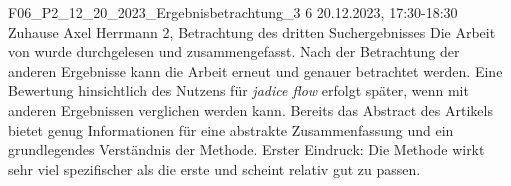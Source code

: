 \fieldnote
{F06\_P2\_12\_20\_2023\_Ergebnisbetrachtung\_3}
{6}
{20.12.2023, 17:30-18:30}
{Zuhause}
{Axel Herrmann}
{2, Betrachtung des dritten Suchergebnisses}
{
	Die Arbeit von  wurde durchgelesen und zusammengefasst.
}
{
	Nach der Betrachtung der anderen Ergebnisse kann die Arbeit erneut und genauer betrachtet werden.
	Eine Bewertung hinsichtlich des Nutzens für \emph{jadice flow} erfolgt später, wenn mit anderen Ergebnissen verglichen werden kann.
}
{
  Bereits das Abstract des Artikels bietet genug Informationen für eine abstrakte Zusammenfassung und ein grundlegendes Verständnis der Methode.
}
{}
{
	Erster Eindruck: Die Methode wirkt sehr viel spezifischer als die erste und scheint relativ gut zu passen.
}
